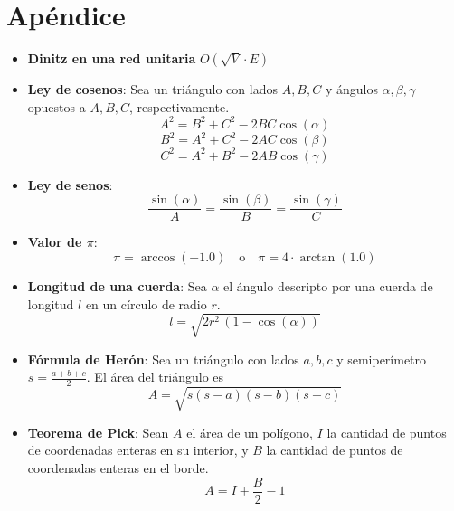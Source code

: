 \documentclass[12pt,a4paper]{article}
\begin{document}
\section*{Apéndice} \vspace{1em}

\begin{itemize}
  \item \textbf{Dinitz en una red unitaria} $O(\sqrt{V}\cdot E)$ \\
  \item \textbf{Ley de cosenos}: Sea un triángulo con lados $A, B, C$ y ángulos 
  $\alpha, \beta, \gamma$ opuestos a $A, B, C$, respectivamente.
  \[
    A^2 = B^2 + C^2 - 2BC \cos(\alpha)
  \]
  \[
    B^2 = A^2 + C^2 - 2AC \cos(\beta)
  \]
  \[
    C^2 = A^2 + B^2 - 2AB \cos(\gamma)
  \]

  \item \textbf{Ley de senos}:
  \[
    \frac{\sin(\alpha)}{A} = \frac{\sin(\beta)}{B} = \frac{\sin(\gamma)}{C}
  \]

  \item \textbf{Valor de $\pi$}: 
  \[
    \pi = \arccos(-1.0) \quad \text{o} \quad \pi = 4 \cdot \arctan(1.0)
  \]

  \item \textbf{Longitud de una cuerda}: Sea $\alpha$ el ángulo descripto por una cuerda de longitud $l$ en un círculo de radio $r$.
  \[
    l = \sqrt{2r^2 \, (1 - \cos(\alpha))}
  \]

  \item \textbf{Fórmula de Herón}: Sea un triángulo con lados $a, b, c$ y semiperímetro $s=\tfrac{a+b+c}{2}$. El área del triángulo es
  \[
    A = \sqrt{s(s-a)(s-b)(s-c)}
  \]

  \item \textbf{Teorema de Pick}: Sean $A$ el área de un polígono, $I$ la cantidad de puntos de coordenadas enteras en su interior, y $B$ la cantidad de puntos de coordenadas enteras en el borde.
  \[
    A = I + \frac{B}{2} - 1
  \]
\end{itemize}
\end{document}
